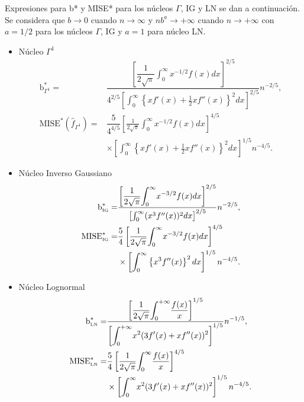 Expresiones para b* y MISE* para los núcleos $\Gamma$, IG y LN  se dan a continuación. Se considera que $b \to 0$ cuando $n \to \infty$ y $n b^a \to +\infty$ cuando $n \to +\infty$ con $a=1/2$ para los núcleos $\Gamma$, IG y $a=1$ para núcleo LN.

\begin{itemize}
	\item Núcleo $\Gamma^1$
	\begin{align}
	\label{MISEoptGamma}
	\text{b}^*_{\Gamma^1}=&\dfrac{\left[\dfrac{1}{2\sqrt{\pi}} \displaystyle{\int_{0}^{\infty}} x^{-1/2}f(x)dx \right]^{2/5}}
	{4^{2/5} \left[\displaystyle{\int_{0}^{\infty}} \left\{x f'(x) +\frac{1}{2} x f''(x)\right\}^2 dx \right]^{2/5}} n^{-2/5},\\
	\nonumber \text{MISE}^*(\widehat{f}_{\Gamma^1})=&\dfrac{5}{4^{4/5}} \left[\frac{1}{2\sqrt{\pi}} \int_{0}^{\infty} x^{-1/2}f(x)dx \right]^{4/5} \\
	&\times \left[\int_{0}^{\infty}  \left\{x f'(x) +\frac{1}{2} x f''(x)\right\}^2 dx \right]^{1/5} n^{-4/5}. 
	\end{align}
	\item Núcleo Inverso Gaussiano
	\begin{align}
	\label{MISEoptIG}
	\text{b}^*_{\text{\tiny{IG}}}=&\dfrac{\left[\dfrac{1}{2\sqrt{\pi}} \displaystyle{\int_{0}^{\infty}} x^{-3/2}f(x)dx \right]^{2/5}}
	{ \left[\int_{0}^{\infty}(x^3 f''(x))^2 dx \right]^{2/5}} n^{-2/5},\\
	\nonumber \text{MISE}^*_{\text{\tiny{IG}}}=&\dfrac{5}{4} \left[\frac{1}{2\sqrt{\pi}} \displaystyle{\int_{0}^{\infty}} x^{-3/2}f(x)dx \right]^{4/5} \\
	&\times \left[\displaystyle{\int_{0}^{\infty}}  \left\{x^3 f''(x) \right\}^2 dx \right]^{1/5} n^{-4/5} .
	\end{align}
	\item Núcleo Lognormal
	\begin{align}
	\label{MISEoptLN}
	\text{b}^*_{\text{\tiny{LN}}}=&\dfrac{\left[\dfrac{1}{2\sqrt{\pi}}\displaystyle{\int_0^{+\infty}}\frac{f(x)}{x}\right]^{1/5}}{\left[\displaystyle{\int_0^{+\infty}} x^2(3f'(x)+xf''(x))^2\right]^{1/5}}n^{-1/5},\\
	\nonumber \text{MISE}^*_{\text{\tiny{LN}}}=&\dfrac{5}{4}  \left[\dfrac{1}{2\sqrt{\pi}}\displaystyle{\int_{0}^{\infty}} \frac{f(x)}{x} \right]^{4/5} \\
	&\times \left[\displaystyle{\int_{0}^{\infty}}  x^2 (3 f'(x) + x f''(x))^2 \right]^{1/5} n^{-4/5}.
	\end{align}
\end{itemize}

